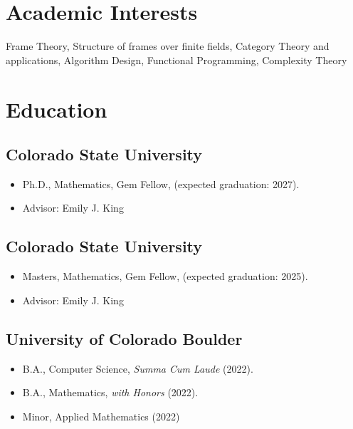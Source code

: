 \documentclass{cv_style}
\begin{document}

    \begin{center}  

    
	\end{center}
	
	\section{Academic Interests}
	Frame Theory, Structure of frames over finite fields, Category Theory and applications, Algorithm Design, Functional Programming, Complexity Theory

	\section{Education}
		\subsection{Colorado State University}
				\begin{itemize}
					\item Ph.D., Mathematics, Gem Fellow, (expected graduation: 2027).
					\item Advisor: Emily J. King
				\end{itemize}

		\subsection{Colorado State University}
				\begin{itemize}
					\item Masters, Mathematics, Gem Fellow, (expected graduation: 2025).
					\item Advisor: Emily J. King
				\end{itemize}
				
		\subsection{University of Colorado Boulder}
				\begin{itemize}
					\item B.A., Computer Science, \textit{Summa Cum Laude} (2022).
					\item B.A., Mathematics, \textit{with Honors} (2022).
					\item Minor, Applied Mathematics (2022)
				\end{itemize}
	
\end{document}
